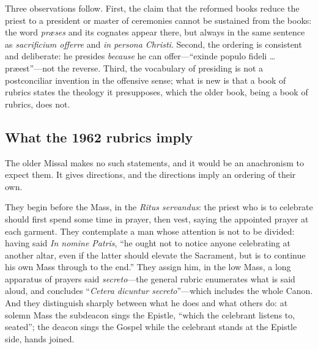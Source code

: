 Three observations follow. First, the claim that the reformed books reduce the priest to a president or master of ceremonies cannot be sustained from the books: the word \emph{præses} and its cognates appear there, but always in the same sentence as \emph{sacrificium offerre} and \emph{in persona Christi}. Second, the ordering is consistent and deliberate: he presides \emph{because} he can offer---``exinde populo fideli \dots{} præest''---not the reverse. Third, the vocabulary of presiding is not a postconciliar invention in the offensive sense; what is new is that a book of rubrics states the theology it presupposes, which the older book, being a book of rubrics, does not.

\subsection{What the 1962 rubrics imply}

The older Missal makes no such statements, and it would be an anachronism to expect them. It gives directions, and the directions imply an ordering of their own.

They begin before the Mass, in the \emph{Ritus servandus}: the priest who is to celebrate should first spend some time in prayer, then vest, saying the appointed prayer at each garment. They contemplate a man whose attention is not to be divided: having said \emph{In nomine Patris}, ``he ought not to notice anyone celebrating at another altar, even if the latter should elevate the Sacrament, but is to continue his own Mass through to the end.'' They assign him, in the low Mass, a long apparatus of prayers said \emph{secreto}---the general rubric enumerates what is said aloud, and concludes ``\emph{Cetera dicuntur secreto}''---which includes the whole Canon. And they distinguish sharply between what he does and what others do: at solemn Mass the subdeacon sings the Epistle, ``which the celebrant listens to, seated''; the deacon sings the Gospel while the celebrant stands at the Epistle side, hands joined.

